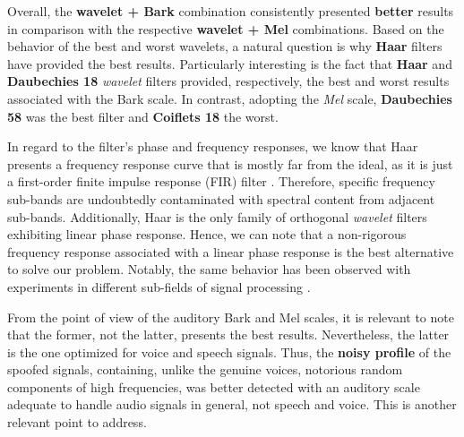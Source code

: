 	\par Overall, the \textbf{wavelet + Bark} combination consistently presented \textbf{better} results in comparison with the respective \textbf{wavelet + Mel} combinations. Based on the behavior of the best and worst wavelets, a natural question is why \textbf{Haar} filters have provided the best results. Particularly interesting is the fact that \textbf{Haar} and \textbf{Daubechies 18} \textit{wavelet} filters provided, respectively, the best and worst results associated with the Bark scale. In contrast, adopting the \textit{Mel} scale, \textbf{Daubechies 58} was the best filter and \textbf{Coiflets 18} the worst.
	\\
	\par In regard to the filter's phase and frequency responses, we know that Haar presents a frequency response curve that is mostly far from the ideal, as it is just a first-order finite impulse response (FIR) filter \cite{WaveletPropertiesBrowser}. Therefore, specific frequency sub-bands are undoubtedly contaminated with spectral content from adjacent sub-bands. Additionally, Haar is the only family of orthogonal \textit{wavelet} filters exhibiting linear phase response. Hence, we can note that a non-rigorous frequency response associated with a linear phase response is the best alternative to solve our problem. Notably, the same behavior has been observed with experiments in different sub-fields of signal processing \cite{guido2}\cite{guido3}\cite{guido4}. 
	\\
	\par From the point of view of the auditory Bark and Mel scales, it is relevant to note that the former, not the latter, presents the best results. Nevertheless, the latter is the one optimized for voice and speech signals. Thus, the \textbf{noisy profile} of the spoofed signals, containing, unlike the genuine voices, notorious random components of high frequencies, was better detected with an auditory scale adequate to handle audio signals in general, not speech and voice. This is another relevant point to address. 
	
	
	

